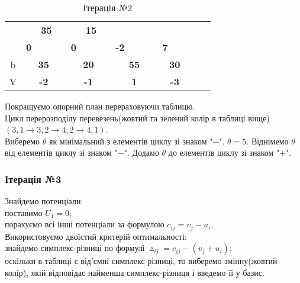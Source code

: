 \documentclass[a4paper, 12pt]{article}
\begin{document}
\begin{table}[H]
\begin{tabular}{|c|cccc|cccc|cccc|cccc|rr|}
\cline{2-2}\cline{5-6}\cline{9-9}\cline{13-13}\cline{17-17}          &       & \multicolumn{2}{c}{\multirow{2}[2]{*}{\textbf{35}}} &       &       & \multicolumn{2}{c}{\multirow{2}[2]{*}{\textbf{15}}} &       &       & \multicolumn{2}{c}{\multirow{2}[2]{*}{}} &       &       & \multicolumn{2}{c}{\multirow{2}[2]{*}{}} &       & \multicolumn{1}{c|}{} &  \bigstrut[t]\\
          &       & \multicolumn{2}{c}{} &       &       & \multicolumn{2}{c}{} &       &       & \multicolumn{2}{c}{} &       &       & \multicolumn{2}{c}{} &       & \multicolumn{1}{c|}{} &  \bigstrut[b]\\
\cline{2-2}\cline{6-6}\cline{10-10}\cline{14-14}          & \multicolumn{1}{c|}{\textbf{0}} &       &       &       & \multicolumn{1}{c|}{\textbf{0}} & \multicolumn{2}{c}{} &       & \multicolumn{1}{c|}{\textbf{-2}} &       &       &       & \multicolumn{1}{c|}{\textbf{7}} & \multicolumn{2}{c}{} &       & \multicolumn{1}{c|}{} &  \bigstrut\\
    \hline
    b     & \multicolumn{4}{c|}{\textbf{35}} & \multicolumn{4}{c|}{\textbf{20}} & \multicolumn{4}{c|}{\textbf{55}} & \multicolumn{4}{c|}{\textbf{30}} &       &  \bigstrut\\
\cline{1-17}    V     & \multicolumn{4}{c|}{\textbf{-2}} & \multicolumn{4}{c|}{\textbf{-1}} & \multicolumn{4}{c|}{\textbf{1}} & \multicolumn{4}{c|}{\textbf{-3}} &       &  \bigstrut\\
    \hline
    \end{tabular}%
  \caption{Ітерація №2}
  \label{tab:it2}%
\end{table}%

Покращуємо опорний план перераховуючи таблицю.\\

Цикл перерозподілу перевезень(жовтий та зелений колір в таблиці вище) $(3,1 \longrightarrow 3,2 \longrightarrow 4,2 \longrightarrow 4,1)$.\\

Виберемо $\theta$ як мінімальний з елементів циклу зі знаком "$-$". $\theta = 5$. Віднімемо $\theta$ від елементів циклу зі знаком "$-$". Додамо $\theta$ до елементів циклу зі знаком "$+$".

\subsubsection{Ітерація №3}

Знайдемо потенціали:\\
поставимо $U_1 = 0$;\\
порахуємо всі інші потенціали за формулою $c_{ij} = v_j - u_i$.\\
Використовуємо двоїстий критерій оптимальності:\\
знайдемо симплекс-різниці по формулі $\vartriangle_{ij} = c_{ij} - (v_j + u_i) $;\\
оскільки в таблиці є від'ємні симплекс-різниці, то виберемо змінну(жовтий колір), якій відповідає найменша симплекс-різниця і введемо її у базис.
\end{document}
